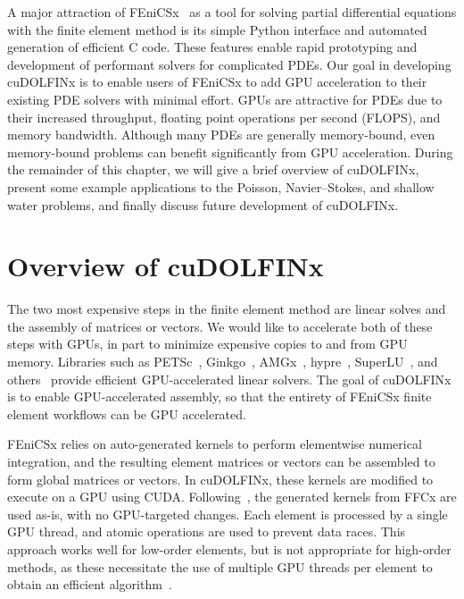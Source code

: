 A major attraction of FEniCSx~\citep{baratta2023dolfinx} as a tool for solving partial differential equations with the finite element method is its simple Python interface and automated generation of efficient C code. These features enable rapid prototyping and development of performant solvers for complicated PDEs. Our goal in developing cuDOLFINx is to enable users of FEniCSx to add GPU acceleration to their existing PDE solvers with minimal effort.
GPUs are attractive for PDEs due to their increased throughput, floating point operations per second (FLOPS), and memory bandwidth. Although many PDEs are generally memory-bound, even memory-bound problems can benefit significantly from GPU acceleration. During the remainder of this chapter, we will give a brief overview of cuDOLFINx, present some example applications to the Poisson, Navier--Stokes, and shallow water problems, and finally discuss future development of cuDOLFINx.

\section*{Overview of cuDOLFINx}
The two most expensive steps in the finite element method are linear solves and the assembly of matrices or vectors. We would like to accelerate both of these steps with GPUs, in part to minimize expensive copies to and from GPU memory. Libraries such as PETSc~\citep{MILLS2021102831}, Ginkgo~\citep{ginkgo-toms-2022}, AMGx~\citep{naumov2015amgx}, hypre~\citep{li2020efficient,falgout2021porting}, SuperLU~\citep{li2023newly}, and others~\citep{lu2023tilesptrsv} provide efficient GPU-accelerated linear solvers. The goal of cuDOLFINx is to enable GPU-accelerated assembly, so that the entirety of FEniCSx finite element workflows can be GPU accelerated.

FEniCSx relies on auto-generated kernels to perform elementwise numerical integration, and the resulting element matrices or vectors can be assembled to form global matrices or vectors. In cuDOLFINx, these kernels are modified to execute on a GPU using CUDA. Following~\cite{trotter2023targeting}, the generated kernels from FFCx are used as-is, with no GPU-targeted changes. Each element is processed by a single GPU thread, and atomic operations are used to prevent data races. This approach works well for low-order elements, but is not appropriate for high-order methods, as these necessitate the use of multiple GPU threads per element to obtain an efficient algorithm~\citep{MACIOL20101093,dziekonski2013generation,abdelfattah2021gpu, swirydowicz2019acceleration}.

